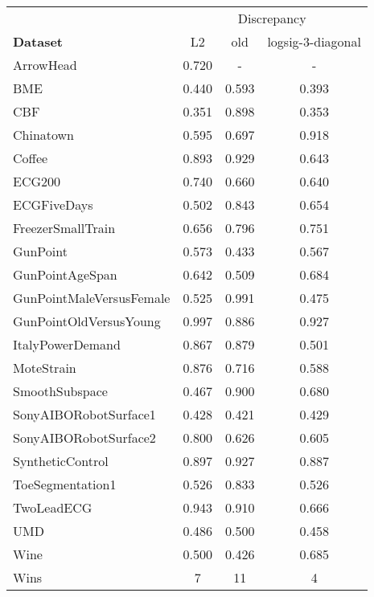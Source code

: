 \begin{tabular}{lccc}
\toprule
&  \multicolumn{3}{c}{Discrepancy} \\
\textbf{Dataset} &    L2 &   old &  logsig-3-diagonal \\
\midrule
ArrowHead                & 0.720 &     - &                  - \\
BME                      & 0.440 & 0.593 &              0.393 \\
CBF                      & 0.351 & 0.898 &              0.353 \\
Chinatown                & 0.595 & 0.697 &              0.918 \\
Coffee                   & 0.893 & 0.929 &              0.643 \\
ECG200                   & 0.740 & 0.660 &              0.640 \\
ECGFiveDays              & 0.502 & 0.843 &              0.654 \\
FreezerSmallTrain        & 0.656 & 0.796 &              0.751 \\
GunPoint                 & 0.573 & 0.433 &              0.567 \\
GunPointAgeSpan          & 0.642 & 0.509 &              0.684 \\
GunPointMaleVersusFemale & 0.525 & 0.991 &              0.475 \\
GunPointOldVersusYoung   & 0.997 & 0.886 &              0.927 \\
ItalyPowerDemand         & 0.867 & 0.879 &              0.501 \\
MoteStrain               & 0.876 & 0.716 &              0.588 \\
SmoothSubspace           & 0.467 & 0.900 &              0.680 \\
SonyAIBORobotSurface1    & 0.428 & 0.421 &              0.429 \\
SonyAIBORobotSurface2    & 0.800 & 0.626 &              0.605 \\
SyntheticControl         & 0.897 & 0.927 &              0.887 \\
ToeSegmentation1         & 0.526 & 0.833 &              0.526 \\
TwoLeadECG               & 0.943 & 0.910 &              0.666 \\
UMD                      & 0.486 & 0.500 &              0.458 \\
Wine                     & 0.500 & 0.426 &              0.685 \\ 
\midrule
Wins &   7 &   11 &                  4 \\
\bottomrule
\end{tabular}
